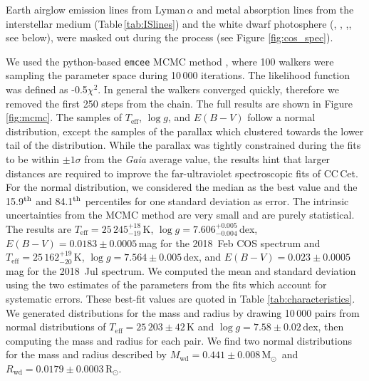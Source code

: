 \documentclass[fleqn,usenatbib]{mnras}
\newcommand{\Rwd}{\mbox{$R_{\mathrm{wd}}$}}
\newcommand{\Mwd}{\mbox{$M_{\mathrm{wd}}$}}
\newcommand{\Msun}{\mbox{$\mathrm{M}_{\odot}$}}
\newcommand{\Rsun}{\mbox{$\mathrm{R}_{\odot}$}}
\newcommand{\Teff}{\mbox{$T_{\mathrm{eff}}$}}
\newcommand{\logg}{\mbox{$\log g$}}
\begin{document}
Earth airglow emission lines from Lyman\,$\alpha$ and metal absorption lines from the interstellar medium (Table\,\ref{tab:ISlines}) and the white dwarf photosphere (, , ,, see below), were masked out during the process (see Figure \ref{fig:cos_spec}).

We used the python-based \texttt{emcee} MCMC method \citep{foreman-mackeyetal13-1}, where 100 walkers were sampling the parameter space during 10\,000 iterations. The likelihood function was defined as -0.5$\chi^{2}$. In general the walkers converged quickly, therefore we removed the first 250 steps from the chain. The full results are shown in Figure \ref{fig:mcmc}. The samples of \Teff, \logg, and $E(B-V)$ follow a normal distribution, except the samples of the parallax which clustered towards the lower tail of the distribution. While the parallax was tightly constrained during the fits to be within $\pm1\sigma$ from the \textit{Gaia} average value, the results hint that larger distances are required to improve the far-ultraviolet spectroscopic fits of CC\,Cet. For the normal distribution, we considered the median as the best value and the 15.9$^{\rm th}$ and 84.1$^{\rm th}$ percentiles for one standard deviation as error. The intrinsic uncertainties from the MCMC method are very small and are purely statistical. The results are $\Teff=25\,245^{+18}_{-19}$\,K, $\logg=7.606^{+0.005}_{-0.004}$\,dex, $E(B-V) = 0.0183\pm0.0005$\,mag for the 2018~Feb COS spectrum and $\Teff=25\,162^{+19}_{-20}$\,K, $\logg=7.564\pm0.005$\,dex, and $E(B-V) =0.023\pm0.0005$\,mag for the 2018~Jul spectrum. We computed the mean and standard deviation using the two estimates of the parameters from the fits which account for systematic errors. These best-fit values are quoted in Table \ref{tab:characteristics}. We generated distributions for the mass and radius by drawing 10\,000 pairs from normal distributions of $\Teff=25\,203\pm42$\,K and $\logg=7.58\pm0.02$\,dex, then computing the mass and radius for each pair. We find two normal distributions for the mass and radius described by $\Mwd=0.441\pm0.008$\,\Msun\ and $\Rwd=0.0179\pm0.0003$\,\Rsun.
\end{document}
